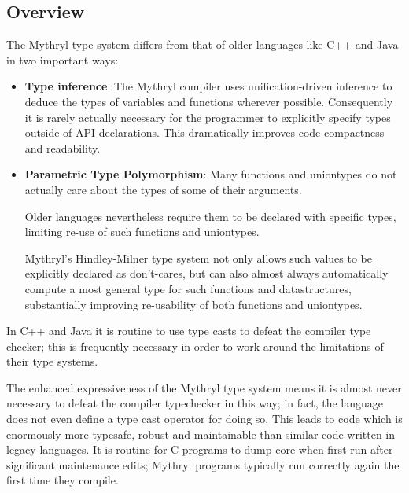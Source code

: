 
\subsection{Overview}
\label{section:ref:types:overview}

The Mythryl type system differs from that of older 
languages like C++ and Java in two important ways: 

\begin{itemize}
\item {\bf Type inference}: The Mythryl compiler uses unification-driven 
      inference to deduce the types of variables and functions wherever 
      possible.  Consequently it is rarely actually necessary for the 
      programmer to explicitly specify types outside of API declarations. 
      This dramatically improves code compactness and readability.

\item {\bf Parametric Type Polymorphism}: Many functions and uniontypes 
      do not actually care about the types of some of their arguments.

      Older languages nevertheless require them to be declared with 
      specific types, limiting re-use of such functions and uniontypes.

      Mythryl's Hindley-Milner type system not only allows such values 
      to be explicitly declared as don't-cares, but can also almost always 
      automatically compute a most general type for such functions and 
      datastructures, substantially improving re-usability of both 
      functions and uniontypes.
\end{itemize}

In C++ and Java it is routine to use type casts to defeat the 
compiler type checker;  this is frequently necessary in order 
to work around the limitations of their type systems.

The enhanced expressiveness of the Mythryl type system means 
it is almost never necessary to defeat the compiler typechecker 
in this way;  in fact, the language does not even define a type 
cast operator for doing so.  This leads to code which is enormously 
more typesafe, robust and maintainable than similar code written 
in legacy languages.  It is routine for C programs to dump core 
when first run after significant maintenance edits;  Mythryl 
programs typically run correctly again the first time they 
compile.



